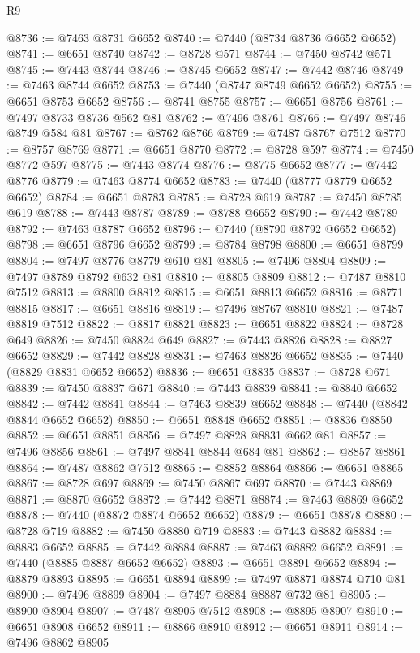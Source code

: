 \begin{lexlean}{R9}
\begin{coremodule}
@8736 := @7463 @8731 @6652
@8740 := @7440 (@8734 @8736 @6652 @6652)
@8741 := @6651 @8740
@8742 := @8728 @571
@8744 := @7450 @8742 @571
@8745 := @7443 @8744
@8746 := @8745 @6652
@8747 := @7442 @8746
@8749 := @7463 @8744 @6652
@8753 := @7440 (@8747 @8749 @6652 @6652)
@8755 := @6651 @8753 @6652
@8756 := @8741 @8755
@8757 := @6651 @8756
@8761 := @7497 @8733 @8736 @562 @81
@8762 := @7496 @8761
@8766 := @7497 @8746 @8749 @584 @81
@8767 := @8762 @8766
@8769 := @7487 @8767 @7512
@8770 := @8757 @8769
@8771 := @6651 @8770
@8772 := @8728 @597
@8774 := @7450 @8772 @597
@8775 := @7443 @8774
@8776 := @8775 @6652
@8777 := @7442 @8776
@8779 := @7463 @8774 @6652
@8783 := @7440 (@8777 @8779 @6652 @6652)
@8784 := @6651 @8783
@8785 := @8728 @619
@8787 := @7450 @8785 @619
@8788 := @7443 @8787
@8789 := @8788 @6652
@8790 := @7442 @8789
@8792 := @7463 @8787 @6652
@8796 := @7440 (@8790 @8792 @6652 @6652)
@8798 := @6651 @8796 @6652
@8799 := @8784 @8798
@8800 := @6651 @8799
@8804 := @7497 @8776 @8779 @610 @81
@8805 := @7496 @8804
@8809 := @7497 @8789 @8792 @632 @81
@8810 := @8805 @8809
@8812 := @7487 @8810 @7512
@8813 := @8800 @8812
@8815 := @6651 @8813 @6652
@8816 := @8771 @8815
@8817 := @6651 @8816
@8819 := @7496 @8767 @8810
@8821 := @7487 @8819 @7512
@8822 := @8817 @8821
@8823 := @6651 @8822
@8824 := @8728 @649
@8826 := @7450 @8824 @649
@8827 := @7443 @8826
@8828 := @8827 @6652
@8829 := @7442 @8828
@8831 := @7463 @8826 @6652
@8835 := @7440 (@8829 @8831 @6652 @6652)
@8836 := @6651 @8835
@8837 := @8728 @671
@8839 := @7450 @8837 @671
@8840 := @7443 @8839
@8841 := @8840 @6652
@8842 := @7442 @8841
@8844 := @7463 @8839 @6652
@8848 := @7440 (@8842 @8844 @6652 @6652)
@8850 := @6651 @8848 @6652
@8851 := @8836 @8850
@8852 := @6651 @8851
@8856 := @7497 @8828 @8831 @662 @81
@8857 := @7496 @8856
@8861 := @7497 @8841 @8844 @684 @81
@8862 := @8857 @8861
@8864 := @7487 @8862 @7512
@8865 := @8852 @8864
@8866 := @6651 @8865
@8867 := @8728 @697
@8869 := @7450 @8867 @697
@8870 := @7443 @8869
@8871 := @8870 @6652
@8872 := @7442 @8871
@8874 := @7463 @8869 @6652
@8878 := @7440 (@8872 @8874 @6652 @6652)
@8879 := @6651 @8878
@8880 := @8728 @719
@8882 := @7450 @8880 @719
@8883 := @7443 @8882
@8884 := @8883 @6652
@8885 := @7442 @8884
@8887 := @7463 @8882 @6652
@8891 := @7440 (@8885 @8887 @6652 @6652)
@8893 := @6651 @8891 @6652
@8894 := @8879 @8893
@8895 := @6651 @8894
@8899 := @7497 @8871 @8874 @710 @81
@8900 := @7496 @8899
@8904 := @7497 @8884 @8887 @732 @81
@8905 := @8900 @8904
@8907 := @7487 @8905 @7512
@8908 := @8895 @8907
@8910 := @6651 @8908 @6652
@8911 := @8866 @8910
@8912 := @6651 @8911
@8914 := @7496 @8862 @8905

\end{coremodule}
\end{lexlean}
